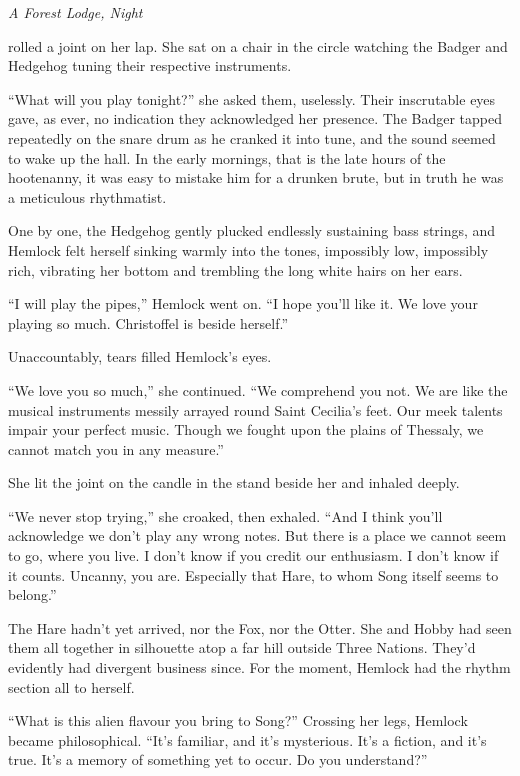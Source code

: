 \documentclass[11pt,a5paper]{article}
\newcommand{\alet}[1]{\textit{#1}\vspace{1em}}
\begin{document}
\alet{A Forest Lodge, Night}

 rolled a joint on her lap. She sat on a chair in the circle watching the Badger and Hedgehog tuning their respective instruments.

``What will you play tonight?'' she asked them, uselessly. Their inscrutable eyes gave, as ever, no indication they acknowledged her presence. The Badger tapped repeatedly on the snare drum as he cranked it into tune, and the sound seemed to wake up the hall. In the early mornings, that is the late hours of the hootenanny, it was easy to mistake him for a drunken brute, but in truth he was a meticulous rhythmatist.

One by one, the Hedgehog gently plucked endlessly sustaining bass strings, and Hemlock felt herself sinking warmly into the tones, impossibly low, impossibly rich, vibrating her bottom and trembling the long white hairs on her ears.

``I will play the pipes,'' Hemlock went on. ``I hope you'll like it. We love your playing so much. Christoffel is beside herself.''

Unaccountably, tears filled Hemlock's eyes.

``We love you so much,'' she continued. ``We comprehend you not. We are like the musical instruments messily arrayed round Saint Cecilia's feet. Our meek talents impair your perfect music. Though we fought upon the plains of Thessaly, we cannot match you in any measure.''

She lit the joint on the candle in the stand beside her and inhaled deeply.

``We never stop trying,'' she croaked, then exhaled. ``And I think you'll acknowledge we don't play any wrong notes. But there is a place we cannot seem to go, where you live. I don't know if you credit our enthusiasm. I don't know if it counts. Uncanny, you are. Especially that Hare, to whom Song itself seems to belong.''

The Hare hadn't yet arrived, nor the Fox, nor the Otter. She and Hobby had seen them all together in silhouette atop a far hill outside Three Nations. They'd evidently had divergent business since. For the moment, Hemlock had the rhythm section all to herself.

``What is this alien flavour you bring to Song?'' Crossing her legs, Hemlock became philosophical. ``It's familiar, and it's mysterious. It's a fiction, and it's true. It's a memory of something yet to occur. Do you understand?''
\end{document}

